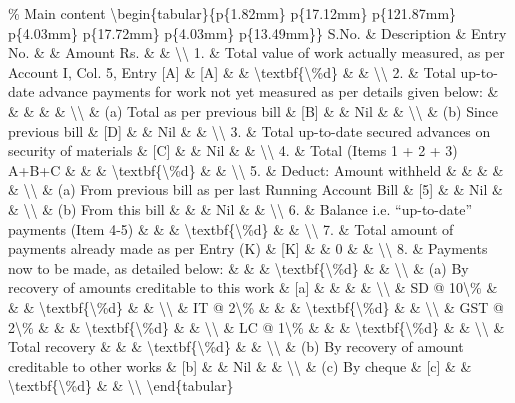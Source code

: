 \% Main content
\textbackslash{}begin\{tabular\}\{p\{1.82mm\} p\{17.12mm\} p\{121.87mm\} p\{4.03mm\} p\{17.72mm\} p\{4.03mm\} p\{13.49mm\}\}
S.No. \& Description \& Entry No. \& \& Amount Rs. \& \& \textbackslash{}\textbackslash{}
1. \& Total value of work actually measured, as per Account I, Col. 5, Entry [A] \& [A] \& \& \textbackslash{}textbf\{\textbackslash{}\%d\} \& \& \textbackslash{}\textbackslash{}
2. \& Total up-to-date advance payments for work not yet measured as per details given below: \& \& \& \& \& \textbackslash{}\textbackslash{}
\& (a) Total as per previous bill \& [B] \& \& Nil \& \& \textbackslash{}\textbackslash{}
\& (b) Since previous bill \& [D] \& \& Nil \& \& \textbackslash{}\textbackslash{}
3. \& Total up-to-date secured advances on security of materials \& [C] \& \& Nil \& \& \textbackslash{}\textbackslash{}
4. \& Total (Items 1 + 2 + 3) A+B+C \& \& \& \textbackslash{}textbf\{\textbackslash{}\%d\} \& \& \textbackslash{}\textbackslash{}
5. \& Deduct: Amount withheld \& \& \& \& \& \textbackslash{}\textbackslash{}
\& (a) From previous bill as per last Running Account Bill \& [5] \& \& Nil \& \& \textbackslash{}\textbackslash{}
\& (b) From this bill \& \& \& Nil \& \& \textbackslash{}\textbackslash{}
6. \& Balance i.e. ``up-to-date'' payments (Item 4-5) \& \& \& \textbackslash{}textbf\{\textbackslash{}\%d\} \& \& \textbackslash{}\textbackslash{}
7. \& Total amount of payments already made as per Entry (K) \& [K] \& \& 0 \& \& \textbackslash{}\textbackslash{}
8. \& Payments now to be made, as detailed below: \& \& \& \textbackslash{}textbf\{\textbackslash{}\%d\} \& \& \textbackslash{}\textbackslash{}
\& (a) By recovery of amounts creditable to this work \& [a] \& \& \& \& \textbackslash{}\textbackslash{}
\& SD @ 10\textbackslash{}\% \& \& \& \textbackslash{}textbf\{\textbackslash{}\%d\} \& \& \textbackslash{}\textbackslash{}
\& IT @ 2\textbackslash{}\% \& \& \& \textbackslash{}textbf\{\textbackslash{}\%d\} \& \& \textbackslash{}\textbackslash{}
\& GST @ 2\textbackslash{}\% \& \& \& \textbackslash{}textbf\{\textbackslash{}\%d\} \& \& \textbackslash{}\textbackslash{}
\& LC @ 1\textbackslash{}\% \& \& \& \textbackslash{}textbf\{\textbackslash{}\%d\} \& \& \textbackslash{}\textbackslash{}
\& Total recovery \& \& \& \textbackslash{}textbf\{\textbackslash{}\%d\} \& \& \textbackslash{}\textbackslash{}
\& (b) By recovery of amount creditable to other works \& [b] \& \& Nil \& \& \textbackslash{}\textbackslash{}
\& (c) By cheque \& [c] \& \& \textbackslash{}textbf\{\textbackslash{}\%d\} \& \& \textbackslash{}\textbackslash{}
\textbackslash{}end\{tabular\}

